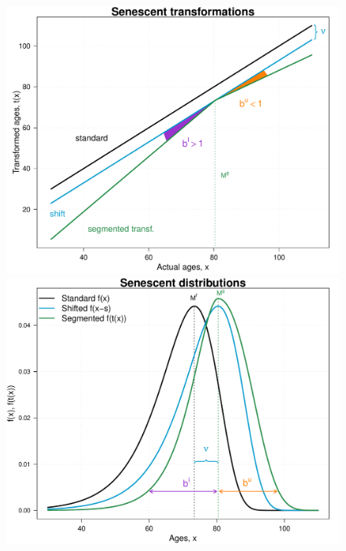 \documentclass[11pt, a4paper]{article}
\begin{document}
\begin{figure}[h!]
	\begin{center}
		\includegraphics[scale=0.32]{./Figures/F3a.pdf}\includegraphics[scale=0.32]{./Figures/F3b.pdf}

\end{center}
\end{figure}
\end{document}

